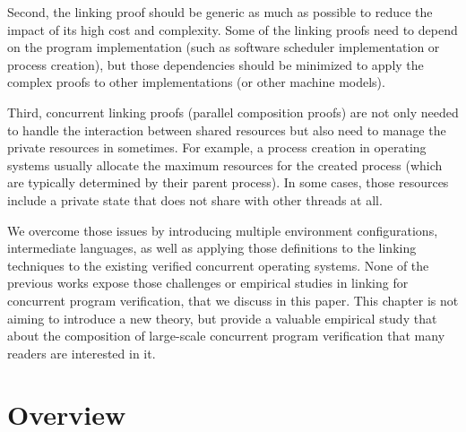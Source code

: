 Second,  
the linking proof should be generic as much as possible to reduce the impact of its high cost and complexity. 
Some of the linking proofs need to depend
on the program implementation (such as software scheduler implementation or process creation), 
but those dependencies should be minimized to apply the complex proofs to other implementations (or other machine models). 

Third, 
concurrent linking proofs (parallel composition proofs) 
are not only needed to handle the interaction between shared resources but also need to manage  the private resources in sometimes. 
For example, a process creation in operating systems usually allocate the maximum resources 
for the created process (which are typically determined by their parent process).
In some cases, those resources include a private state that does not share with other threads at all. 



We overcome those issues by introducing multiple environment configurations, intermediate languages, 
as well as applying those definitions to the linking techniques to the existing verified concurrent operating systems. 
None of the previous works expose those challenges or empirical studies in linking for concurrent program verification,
that we discuss in this paper.
This chapter is not aiming to introduce a new theory, 
but provide a valuable empirical study that 
about the composition of large-scale concurrent program verification that many readers are interested in it.


\section{Overview}
\label{chapter:conlink:sec:overview}

